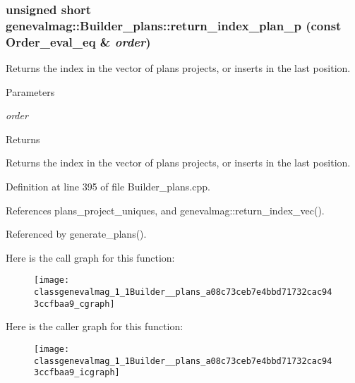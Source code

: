 \hypertarget{classgenevalmag_1_1Builder__plans_a08c73ceb7e4bbd71732cac943ccfbaa9}{
\subsubsection[{return\_\-index\_\-plan\_\-p}]{\setlength{\rightskip}{0pt plus 5cm}unsigned short genevalmag::Builder\_\-plans::return\_\-index\_\-plan\_\-p (const {\bf Order\_\-eval\_\-eq} \& {\em order})}}
\label{classgenevalmag_1_1Builder__plans_a08c73ceb7e4bbd71732cac943ccfbaa9}
Returns the index in the vector of plans projects, or inserts in the last position. 
\begin{DoxyParams}{Parameters}
\item[{\em order}]\end{DoxyParams}
\begin{DoxyReturn}{Returns}

\end{DoxyReturn}
Returns the index in the vector of plans projects, or inserts in the last position. 

Definition at line 395 of file Builder\_\-plans.cpp.



References plans\_\-project\_\-uniques, and genevalmag::return\_\-index\_\-vec().



Referenced by generate\_\-plans().



Here is the call graph for this function:\nopagebreak
\begin{figure}[H]
\begin{center}
\leavevmode
\texttt{[image: classgenevalmag\_1\_1Builder\_\_plans\_a08c73ceb7e4bbd71732cac943ccfbaa9\_cgraph]}
\end{center}
\end{figure}




Here is the caller graph for this function:\nopagebreak
\begin{figure}[H]
\begin{center}
\leavevmode
\texttt{[image: classgenevalmag\_1\_1Builder\_\_plans\_a08c73ceb7e4bbd71732cac943ccfbaa9\_icgraph]}
\end{center}
\end{figure}


